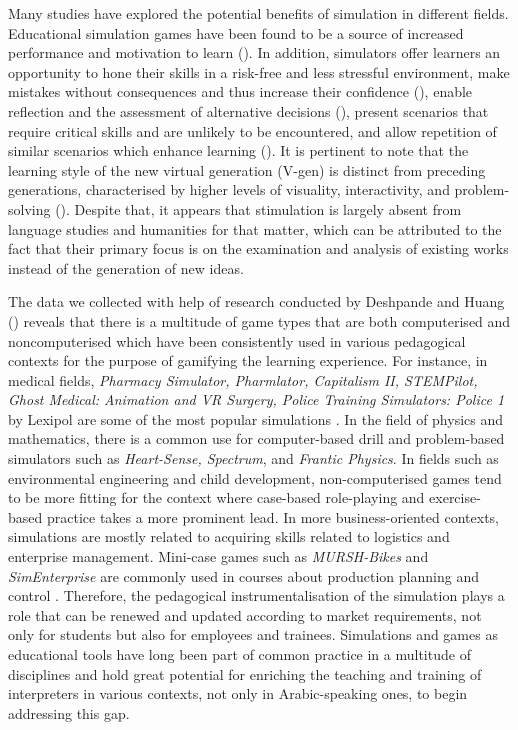 \documentclass[output=paper]{langscibook}
\begin{document}
Many studies have explored the potential benefits of simulation in different fields. Educational simulation games have been found to be a source of increased performance and motivation to learn (\citealt{randel1992effectiveness, terrell1996computer, prensky2003digital, schwabe2005mobile}). In addition, simulators offer learners an opportunity to hone their skills in a risk-free and less stressful environment, make mistakes without consequences and thus increase their confidence (\citealt{alinier2003nursing, salas2009simulation, mahboubian2010educational, lean2020real}), enable reflection and the assessment of alternative decisions (\citealt{cousens2009teaching}), present scenarios that require critical skills and are unlikely to be encountered, and allow repetition of similar scenarios which enhance learning (\citealt{baker2005experimental, salas2009simulation}). It is pertinent to note that the learning style of the new virtual generation (V-gen) is distinct from preceding generations, characterised by higher levels of visuality, interactivity, and problem-solving (\citealt{proserpio2007teaching}). Despite that, it appears that stimulation is largely absent from language studies and humanities for that matter, which can be attributed to the fact that their primary focus is on the examination and analysis of existing works instead of the generation of new ideas. 

The data we collected with help of research conducted by Deshpande and Huang (\citeyear{deshpande_huang2011}) reveals that there is a multitude of game types that are both computerised and noncomputerised which have been consistently used in various pedagogical contexts for the purpose of gamifying the learning experience. For instance, in medical fields, \textit{Pharmacy Simulator, Pharmlator, Capitalism II, STEMPilot, Ghost Medical: Animation and VR Surgery, Police Training Simulators: Police 1} by Lexipol are some of the most popular simulations \citep{raddawi2015intercultural}. In the field of physics and mathematics, there is a common use for computer-based drill and problem-based simulators such as \textit{Heart-Sense, Spectrum}, and \textit{Frantic Physics}. In fields such as environmental engineering and child development, non-computerised games tend to be more fitting for the context where case-based role-playing and exercise-based practice takes a more prominent lead.  In more business-oriented contexts, simulations are mostly related to acquiring skills related to logistics and enterprise management. Mini-case games such as \textit{MURSH-Bikes} and \textit{SimEnterprise} are commonly used in courses about production planning and control \citep{thomas2018effective}. Therefore, the pedagogical instrumentalisation of the simulation plays a role that can be renewed and updated according to market requirements, not only for students but also for employees and trainees. Simulations and games as educational tools have long been part of common practice in a multitude of disciplines and hold great potential for enriching the teaching and training of interpreters in various contexts, not only in Arabic-speaking ones, to begin addressing this gap.
\end{document}
